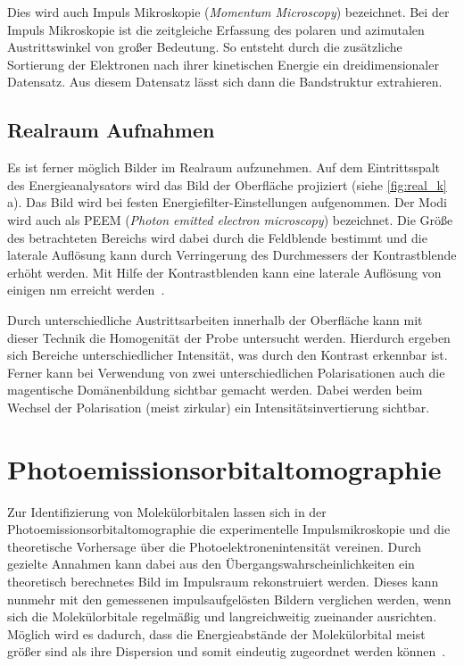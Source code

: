             Dies wird auch Impuls Mikroskopie (\textit{Momentum Microscopy}) bezeichnet.
            Bei der Impuls Mikroskopie ist die zeitgleiche Erfassung des polaren und azimutalen Austrittswinkel von großer Bedeutung. 
            So entsteht durch die zusätzliche Sortierung der Elektronen nach ihrer kinetischen Energie ein dreidimensionaler Datensatz.
            Aus diesem Datensatz lässt sich dann die Bandstruktur extrahieren.

        \subsection{Realraum Aufnahmen}
            Es ist ferner möglich Bilder im Realraum aufzunehmen.
            Auf dem Eintrittsspalt des Energieanalysators wird das Bild der Oberfläche projiziert (siehe \autoref{fig:real_k}\,a).
            Das Bild wird bei festen Energiefilter-Einstellungen aufgenommen.
            Der Modi wird auch als PEEM (\textit{Photon emitted electron microscopy}) bezeichnet.
            Die Größe des betrachteten Bereichs wird dabei durch die Feldblende bestimmt und die laterale Auflösung kann durch Verringerung des Durchmessers der Kontrastblende erhöht werden.
            Mit Hilfe der Kontrastblenden kann eine laterale Auflösung von einigen \si{\nano\meter} erreicht werden~\cite{locatelli_chemical_2015}. 

            Durch unterschiedliche Austrittsarbeiten innerhalb der Oberfläche kann mit dieser Technik die Homogenität der Probe untersucht werden.
            Hierdurch ergeben sich Bereiche unterschiedlicher Intensität, was durch den Kontrast erkennbar ist.
            Ferner kann bei Verwendung von zwei unterschiedlichen Polarisationen auch die magentische Domänenbildung sichtbar gemacht werden.
            Dabei werden beim Wechsel der Polarisation (meist zirkular) ein Intensitätsinvertierung sichtbar.
        
    \section{Photoemissionsorbitaltomographie} \label{sec:MOT}
        Zur Identifizierung von Molekülorbitalen lassen sich in der Photoemissionsorbitaltomographie die experimentelle Impulsmikroskopie und die theoretische Vorhersage über die Photoelektronenintensität vereinen.
        Durch gezielte Annahmen kann dabei aus den Übergangswahrscheinlichkeiten ein theoretisch berechnetes Bild im Impulsraum rekonstruiert werden.
        Dieses kann nunmehr mit den gemessenen impulsaufgelösten Bildern verglichen werden, wenn sich die Molekülorbitale regelmäßig und langreichweitig zueinander ausrichten.
        Möglich wird es dadurch, dass die Energieabstände der Molekülorbital meist größer sind als ihre Dispersion und somit eindeutig zugeordnet werden können~\cite{puschnig_reconstruction_2009}.


